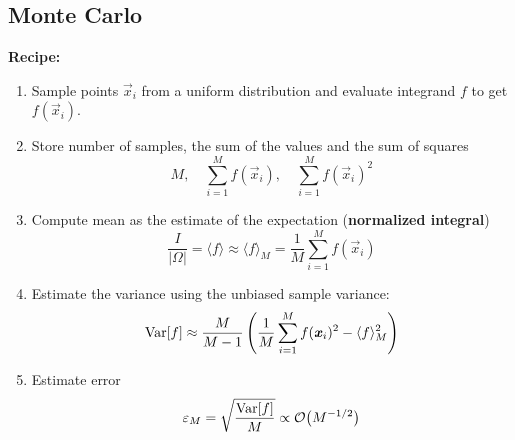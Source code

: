 \subsection{Monte Carlo}
    \textbf{Recipe:}
    \begin{enumerate}
        \item Sample points $\Vec{x}_i$ from a uniform distribution and evaluate integrand $f$ to get $f(\Vec{x}_i)$.
        
        \item Store number of samples, the sum of the values and the sum of squares
        \begin{equation*}
            M, \quad \sum_{i=1}^M f(\Vec{x}_i), \quad \sum_{i=1}^M f(\Vec{x}_i)^2
        \end{equation*}
\vspace{-2mm}       
        \item Compute mean as the estimate of the expectation (\textbf{normalized integral})
        \begin{equation*}
            \frac{I}{|\Omega|} = \langle f \rangle \approx \langle f \rangle_M = \frac{1}{M}\sum_{i=1}^M f(\Vec{x}_i)
        \end{equation*}
\vspace{-2mm}        
        \item Estimate the variance using the unbiased sample variance:
        \begin{equation*}
            \textnormal{Var}[f] \approx \frac{M}{M-1}\left(\frac{1}{M}\sum_{i=1}^M f(\Vec{x}_i)^2-\langle f \rangle_M^2\right)
        \end{equation*}
\vspace{-2mm}       
        \item Estimate error
        \begin{equation*}
            \varepsilon_M = \sqrt{\frac{\textnormal{Var}[f]}{M}} \propto \mathcal{O}\big(M^{-1/2}\big)
        \end{equation*}
    \end{enumerate}
    